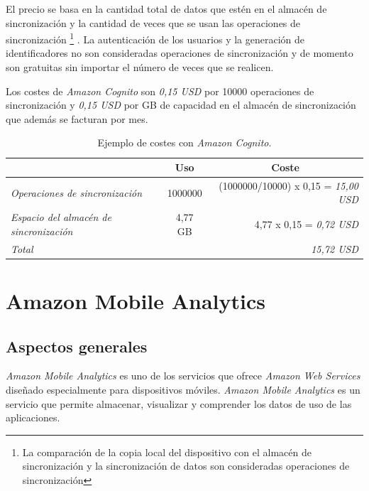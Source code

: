 \documentclass{article}
\begin{document}
	El precio se basa en la cantidad total de datos que estén en el almacén de sincronización y la cantidad de veces que se usan las operaciones de sincronización \footnote{
La comparación de la copia local del dispositivo con el almacén de sincronización y la sincronización de datos son consideradas operaciones de sincronización}
. La autenticación de los usuarios y la generación de identificadores no son consideradas operaciones de sincronización y  de momento son gratuitas sin importar el número de veces que se realicen.

	Los costes de \emph{Amazon Cognito} son \textit{0,15 USD} por 10000 operaciones de sincronización y \textit{0,15 USD} por GB de capacidad en el almacén de sincronización que además se facturan por mes.
	
\begin{table}[h]
	\begin{center}
		\caption{Ejemplo de costes con \emph{Amazon Cognito}.}
		\begin{tabular}{|l|c|r|}
\cline{2-3}
\multicolumn{1}{c|}{}
& \textbf{Uso} & \multicolumn{1}{|c|}{\textbf{Coste}} \\ \hline
\hline
\textit{Operaciones de sincronización} & 1000000 & (1000000/10000) x 0,15 = \textit{15,00 USD} \\ \hline
\textit{Espacio del almacén de sincronización} & 4,77 GB & 4,77 x 0,15 = \textit{0,72 USD} \\ \hline
\hline
\textit{\color{red}Total} & \multicolumn{2}{|r|}{ \textit{\color{red} 15,72 USD}} \\ \hline
		\end{tabular}
		\label{tab:PrizeAmazonCognito}
	\end{center}
\end{table}

\section{Amazon Mobile Analytics}

\subsection{Aspectos generales}

	\emph{Amazon Mobile Analytics} es uno de los servicios que ofrece \emph{Amazon Web Services} diseñado especialmente para dispositivos móviles. \emph{Amazon Mobile Analytics} es un servicio que permite almacenar, visualizar y comprender los datos de uso de las aplicaciones.
	
\end{document}
